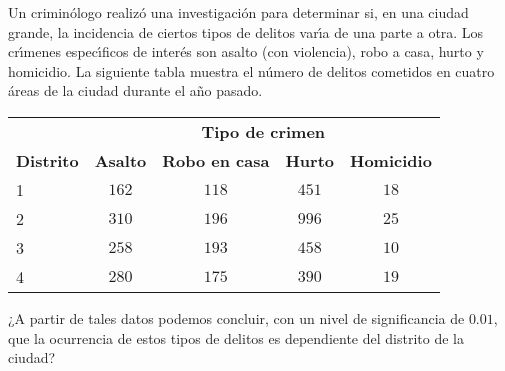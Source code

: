 \begin{enunciado}
 Un crimin\'ologo realiz\'o una investigaci\'on para determinar
 si, en una ciudad grande, la incidencia de ciertos tipos de delitos var\'{\i}a
 de una parte a otra.
 Los cr\'{\i}menes espec\'{\i}ficos de inter\'es son asalto (con violencia),
 robo a casa, hurto y homicidio.
 La siguiente tabla muestra el n\'umero de delitos cometidos en cuatro \'areas
 de la ciudad durante el a\~no pasado.
 \begin{center}
  \begin{tabular}{lcccc}
   & \multicolumn{4}{c}{\textbf{Tipo de crimen}} \\
   \cline{2-5}
   \textbf{Distrito} & \textbf{Asalto} & \textbf{Robo en casa} &
   \textbf{Hurto} & \textbf{Homicidio} \\
   \hline 
   1 & $162$ & $118$ & $451$ & $18$ \\
   2 & $310$ & $196$ & $996$ & $25$ \\
   3 & $258$ & $193$ & $458$ & $10$ \\
   4 & $280$ & $175$ & $390$ & $19$
  \end{tabular}
 \end{center}
 ¿A partir de tales datos podemos concluir, con un nivel de significancia
 de $0.01$, que la ocurrencia de estos tipos de delitos es dependiente del distrito de la ciudad?
\end{enunciado}

